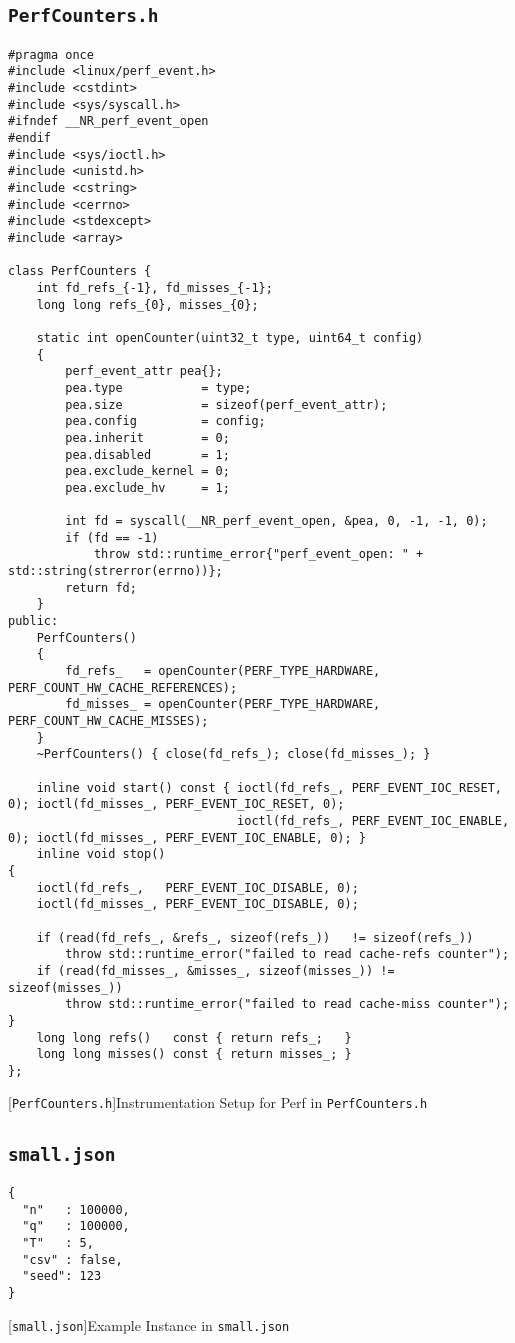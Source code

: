 \subsection{\texttt{PerfCounters.h}}
\label{secsec:perfsetup}
\begin{lstlisting}
#pragma once
#include <linux/perf_event.h>
#include <cstdint>         
#include <sys/syscall.h>    
#ifndef __NR_perf_event_open
#endif
#include <sys/ioctl.h>
#include <unistd.h>
#include <cstring>
#include <cerrno>
#include <stdexcept>
#include <array>

class PerfCounters {
    int fd_refs_{-1}, fd_misses_{-1};
    long long refs_{0}, misses_{0};

    static int openCounter(uint32_t type, uint64_t config)
    {
        perf_event_attr pea{};
        pea.type           = type;
        pea.size           = sizeof(perf_event_attr);
        pea.config         = config;
        pea.inherit        = 0;       
        pea.disabled       = 1;
        pea.exclude_kernel = 0;
        pea.exclude_hv     = 1;

        int fd = syscall(__NR_perf_event_open, &pea, 0, -1, -1, 0);
        if (fd == -1)
            throw std::runtime_error{"perf_event_open: " + std::string(strerror(errno))};
        return fd;
    }
public:
    PerfCounters()
    {
        fd_refs_   = openCounter(PERF_TYPE_HARDWARE, PERF_COUNT_HW_CACHE_REFERENCES);
        fd_misses_ = openCounter(PERF_TYPE_HARDWARE, PERF_COUNT_HW_CACHE_MISSES);
    }
    ~PerfCounters() { close(fd_refs_); close(fd_misses_); }

    inline void start() const { ioctl(fd_refs_, PERF_EVENT_IOC_RESET, 0); ioctl(fd_misses_, PERF_EVENT_IOC_RESET, 0);
                                ioctl(fd_refs_, PERF_EVENT_IOC_ENABLE, 0); ioctl(fd_misses_, PERF_EVENT_IOC_ENABLE, 0); }
    inline void stop()
{
    ioctl(fd_refs_,   PERF_EVENT_IOC_DISABLE, 0);
    ioctl(fd_misses_, PERF_EVENT_IOC_DISABLE, 0);

    if (read(fd_refs_, &refs_, sizeof(refs_))   != sizeof(refs_))
        throw std::runtime_error("failed to read cache-refs counter");
    if (read(fd_misses_, &misses_, sizeof(misses_)) != sizeof(misses_))
        throw std::runtime_error("failed to read cache-miss counter");
}
    long long refs()   const { return refs_;   }
    long long misses() const { return misses_; }
};

\end{lstlisting}
[\texttt{PerfCounters.h}]{Instrumentation Setup for Perf in \texttt{PerfCounters.h}}
\label{lst:perfsetup}


\subsection{\texttt{small.json}}
\label{secsec:smalinstance}
\begin{lstlisting}
{
  "n"   : 100000,
  "q"   : 100000,
  "T"   : 5,
  "csv" : false,
  "seed": 123
}
\end{lstlisting}
[\texttt{small.json}]{Example Instance in \texttt{small.json}}
\label{lst:exampleinstance}